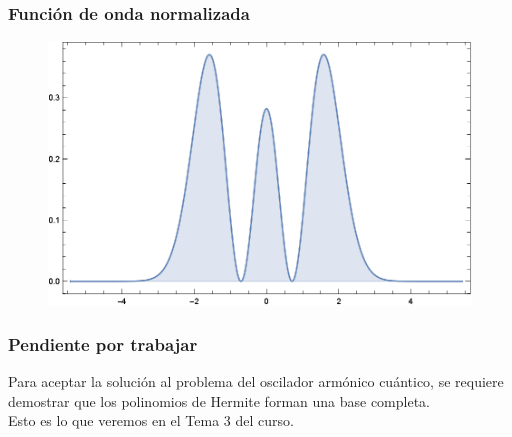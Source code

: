 \documentclass[12pt]{beamer}
\begin{document}
\begin{frame}
\frametitle{Función de onda normalizada}
\begin{figure}
    \centering
    \includegraphics[scale=0.75]{Imagenes/Funcion_Onda_Normalizada_Psi_2.eps}
\end{figure}
\end{frame}
\begin{frame}
\frametitle{Pendiente por trabajar}
Para aceptar la solución al problema del oscilador armónico cuántico, se requiere demostrar que los polinomios de Hermite forman una base completa.
\\
\bigskip
Esto es lo que veremos en el Tema 3 del curso.
\end{frame}
\end{document}
